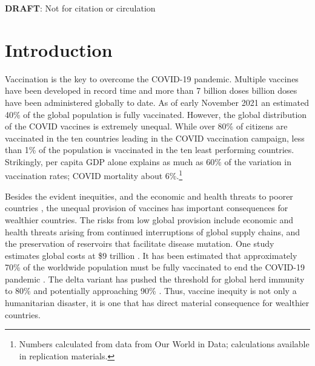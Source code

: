 \documentclass[12pt,oneside]{article}
\begin{document}
\textbf{DRAFT}: Not for citation or circulation



\thispagestyle{empty}

\newpage
\doublespacing

\setcounter{page}{1}

\section*{Introduction}

Vaccination is the key to overcome the COVID-19 pandemic. Multiple vaccines have been developed in record time and more than 7 billion doses billion doses have been administered globally to date.  %
As of early November 2021 an estimated 40\% of the global population is fully vaccinated. However, the global distribution of the COVID vaccines is extremely unequal. While over 80\% of citizens are vaccinated in the ten countries leading in the COVID vaccination campaign, less than 1\% of the population is vaccinated in the ten least performing countries. Strikingly, per capita GDP alone explains as much as  60\% of the variation in vaccination rates; COVID mortality about 6\%.\footnote{Numbers calculated from data from Our World in Data; calculations available in replication materials.}  



Besides the evident inequities, and the economic and health threats to poorer countries \citep{egger2021falling}, the unequal provision of vaccines has important consequences for wealthier countries. The risks from low global provision include economic and health threats  arising from continued interruptions of global supply chains, and the preservation of reservoirs that facilitate disease mutation. One study estimates global costs at \$9 trillion \citet{agarwal2021proposal}. It has been estimated that  approximately 70\% of the worldwide population must be fully vaccinated to end the COVID-19 pandemic \citep{Randolph2020}. The delta variant has pushed the threshold for global herd immunity to  80\% and potentially approaching 90\% \citep{barker2021rethinking}.  Thus, vaccine inequity is not only a humanitarian disaster, it is one that has direct material consequence for wealthier countries. 
\end{document}
